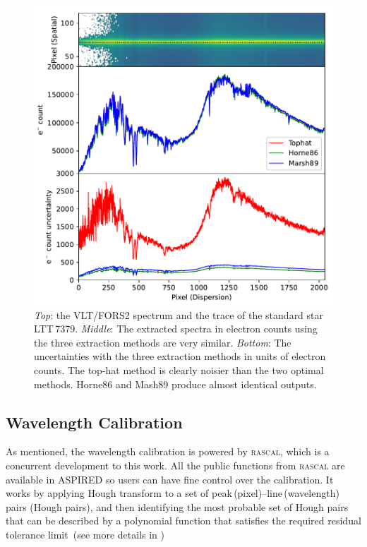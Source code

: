 \documentclass[linenumbers, twocolumn]{aastex631}
\begin{document}
\begin{figure}
    \centering
    \includegraphics[width=\columnwidth]{fig_04_extraction_compared.pdf}
    \caption{\textit{Top}: the VLT/FORS2 spectrum and the trace of the standard
    star LTT\,7379. \textit{Middle}: The extracted spectra in electron counts
    using the three extraction methods are very similar. \textit{Bottom}: The
    uncertainties with the three extraction methods in units of electron counts.
    The top-hat method is clearly noisier than the two optimal methods.
    Horne86 and Mash89 produce almost identical outputs.}
    \label{fig:extraction_compared}
\end{figure}

\subsection{Wavelength Calibration}
As mentioned, the wavelength calibration is powered by \textsc{rascal}, which is
a concurrent development to this work. All the public functions from
\textsc{rascal} are available in \textsc{ASPIRED} so users can have fine control
over the calibration. It works by applying Hough transform to a set of
peak\,(pixel)--line\,(wavelength) pairs (Hough pairs), and then identifying the
most probable set of Hough pairs that can be described by a polynomial
function that satisfies the required residual tolerance limit~(see more
details in \citealt{2020ASPC..527..627V})
\end{document}
